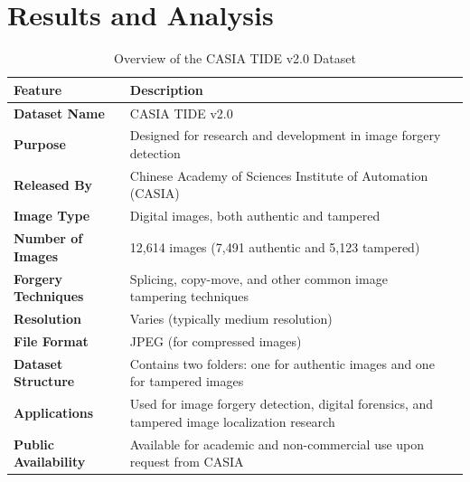 \documentclass{ieeeaccess}
\begin{document}
\section{Results and Analysis}
\begin{table}[h!]
	\centering
	\setlength{\tabcolsep}{3pt}
	\begin{tabular}{|p{75pt}|p{150pt}|p{115pt}|}
		\hline
		\textbf{Feature}            & \textbf{Description}                                                                 \\ \hline
		\textbf{Dataset Name}       & CASIA TIDE v2.0                                                                      \\ \hline
		\textbf{Purpose}            & Designed for research and development in image forgery detection                     \\ \hline
		\textbf{Released By}        & Chinese Academy of Sciences Institute of Automation (CASIA)                          \\ \hline
		\textbf{Image Type}         & Digital images, both authentic and tampered                                          \\ \hline
		\textbf{Number of Images}   & 12,614 images (7,491 authentic and 5,123 tampered)                                   \\ \hline
		\textbf{Forgery Techniques} & Splicing, copy-move, and other common image tampering techniques                      \\ \hline
		\textbf{Resolution}         & Varies (typically medium resolution)                                                 \\ \hline
		\textbf{File Format}        & JPEG (for compressed images)                                                         \\ \hline
		\textbf{Dataset Structure}  & Contains two folders: one for authentic images and one for tampered images           \\ \hline
		\textbf{Applications}       & Used for image forgery detection, digital forensics, and tampered image localization research \\ \hline
		\textbf{Public Availability} & Available for academic and non-commercial use upon request from CASIA               \\ \hline
	\end{tabular}
	\caption{Overview of the CASIA TIDE v2.0 Dataset}
	\label{casiav2overview}
\end{table}
\end{document}
